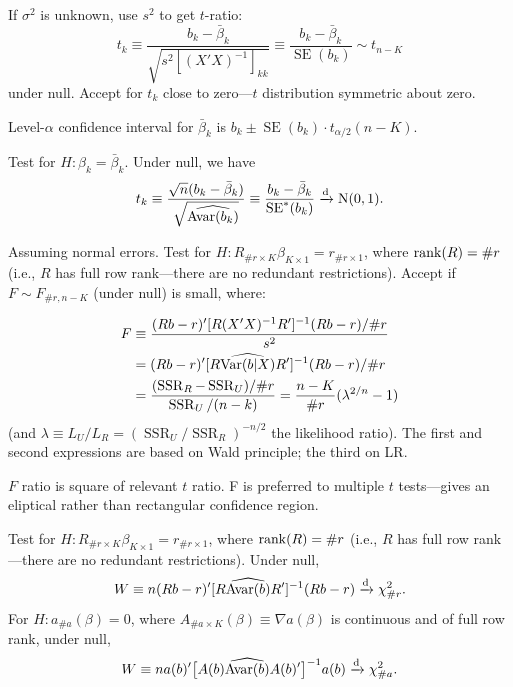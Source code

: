 \documentclass[8pt,letterpaper, landscape]{extarticle} %
\begin{document}
\begin{multicols}{3}
\begin{description}
If $ \sigma^2 $ is unknown, use $ s^2 $ to get $ t $-ratio:
$$ t_k \equiv \frac{b_k - \bar{\beta}_k}{\sqrt{ s^2 [(X'X)^{-1}]_{kk} }} \equiv
\frac{b_k - \bar{\beta}_k}{\operatorname{SE}(b_k)}
\sim t_{n-K} $$
under null. Accept for $ t_k $ close to zero---$ t $ distribution symmetric about zero.

Level-$ \alpha $ confidence interval for $ \bar{\beta}_k $ is $ b_k \pm \operatorname{SE}(b_k) \cdot t_{\alpha / 2} (n-K) $.

 Test for $ H \colon \beta_k = \bar{\beta}_k $. Under null, we have
$$ t_k \equiv \frac{\sqrt{n} (b_k - \bar{\beta}_k)}{\sqrt{ \widehat{\operatorname{Avar} (b_k)} }} \equiv
\frac{b_k - \bar{\beta}_k}{\operatorname{SE}^*(b_k)} \xrightarrow{\text{d}} \operatorname{N} (0,1). $$

 Assuming normal errors. Test for $ H \colon R_{\# r \times K} \beta_{K \times 1} = r_{\# r \times 1} $, where $ \operatorname{rank} (R) = \# r $ (i.e., $ R $ has full row rank---there are no redundant restrictions). Accept if $ F \sim F_{\# r, n-K} $ (under null) is small, where:

\begin{align*}
F &\equiv \frac{(Rb - r)' [R(X'X)^{-1}R']^{-1} (Rb - r) / \# r}{s^2} \\
&= (Rb - r)' [R \widehat{\operatorname{Var} (b|X) } R']^{-1} (Rb - r) / \# r \\
&= \frac{ (\operatorname{SSR}_R - \operatorname{SSR}_U ) / \# r }{\operatorname{SSR}_U / (n-k)} = \frac{n-K}{\# r} (\lambda^{2/n} - 1)
\end{align*}
(and $ \lambda \equiv L_U / L_R = (\operatorname{SSR}_U / \operatorname{SSR}_R)^{-n/2} $ the likelihood ratio). The first and second expressions are based on Wald principle; the third on LR.

$ F $ ratio is square of relevant $ t $ ratio. F is preferred to multiple $ t $ tests---gives an eliptical rather than rectangular confidence region.

 Test for $ H \colon R_{\# r \times K} \beta_{K \times 1} = r_{\# r \times 1} $, where $ \operatorname{rank} (R) = \# r $ (i.e., $ R $ has full row rank---there are no redundant restrictions). Under null,
$$ W \equiv n (Rb - r)' [R \widehat{\operatorname{Avar} (b)} R']^{-1} (Rb - r) \xrightarrow{\text{d}} \chi^2_{\# r}.$$
For $ H \colon a_{\# a} (\beta) = 0 $, where $ A_{\# a \times K} (\beta) \equiv \nabla a (\beta) $ is continuous and of full row rank, under null,
$$ W \equiv n a(b)' \big [ A(b) \widehat{\operatorname{Avar} (b)} A(b)' \big ]^{-1} 
a(b) \xrightarrow{\text{d}} \chi^{2}_{\# a}. $$


\end{description}
\end{multicols}
\end{document}
